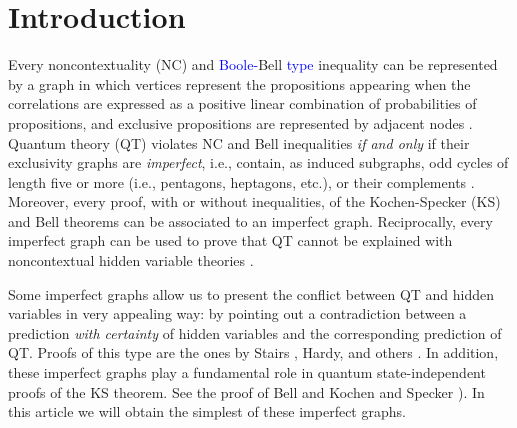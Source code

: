 \documentclass[%
  twocolumn,
 showpacs,
 showkeys,
 preprintnumbers,
 amsmath,amssymb,
 aps,
  pra,
  longbibliography,
 floatfix,
 ]{revtex4-1}
\newcommand{\karl}[1]{\textcolor{blue}{#1}}
\begin{document}


\maketitle


\section{Introduction}


Every noncontextuality (NC) \cite{KCBS08,Cabello08} and \karl{Boole-}Bell \karl{type} inequality \cite{Bell64}
can be represented by a graph in which vertices represent the propositions appearing
when the correlations are expressed as a positive linear combination of probabilities of propositions,
and exclusive propositions are represented by adjacent nodes \cite{CSW10,CSW14}.
Quantum theory (QT) violates NC and Bell inequalities {\em if and only}
if their exclusivity graphs are {\em imperfect}, i.e.,
contain, as induced subgraphs, odd cycles of length five or more (i.e., pentagons, heptagons, etc.),
or their complements \cite{CSW10,CSW14,CDLP13}.
Moreover, every proof, with or without inequalities, of the Kochen-Specker (KS)  \cite{Specker60,KS65,KS67}
and Bell \cite{Bell66} theorems can be associated to an imperfect graph.
Reciprocally, every imperfect graph can be used to prove that QT
cannot be explained with noncontextual hidden variable theories \cite{CSW10,CSW14}.

Some imperfect graphs allow us to present the conflict between QT and hidden variables in very appealing way:
by pointing out a contradiction between a prediction {\em with certainty} of hidden variables
and the corresponding prediction of QT.
Proofs of this type are the ones by Stairs \cite{Stairs83}, Hardy, and others \cite{}.
In addition, these imperfect graphs play a fundamental role in quantum state-independent proofs of the KS theorem.
See the proof of Bell \cite{Bell66} and Kochen and Specker \cite{KS67}).
In this article we will obtain the simplest of these imperfect graphs.
\end{document}
